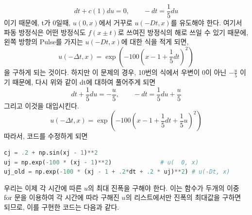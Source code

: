 \documentclass[11pt]{article}
\begin{document}
\begin{equation}
dt + c(1)du  = 0
,\qquad
-dt = \frac{1}{5}du
\end{equation}
이기 때문에, t가 0일때,  $u(0,x)$에서 거꾸로 $u(-Dt, x)$를 유도해야 한다. 여기서 파동 방정식은 어떤 방정식도 $f(x \pm t)$로 쓰여진 방정식의 해로 쓰일 수 있기 때문에,  왼쪽 방향의 Pulse를 가지는 $u(-Dt, x)$에 대한 식을 적게 되면, 
\begin{equation}
u(-\Delta t, x) = \exp(-100 (x -1 + \frac{1}{5}dt)^2)
\end{equation}
을 구하게 되는 것이다. 하지만 이 문제의 경우, 10번의 식에서 우변이 0이 아닌 $-\frac{u}{5}$ 이기 때문에, 다시 위와 같이 dt에 대하여 풀어주게 되면
\begin{equation}
dt + \frac{1}{5}du  = -\frac{u}{5}
,\qquad
-dt = \frac{1}{5}du  + \frac{u}{5}
\end{equation}
그리고 이것을 대입시킨다.
\begin{equation}
u(-\Delta t, x) = \exp(-100 (x -1 + \frac{1}{5}dt + \frac{1}{5}u)^2)
\end{equation}
따라서, 코드를 수정하게 되면

\begin{lstlisting}[language=Python]
cj = .2 + np.sin(xj - 1)**2
uj = np.exp(-100 * (xj - 1)**2)              # u(  0, x)
uj_old = np.exp(-100 * (xj - 1 + .2*dt + .2 * uj)**2) # u(-Dt, x)
\end{lstlisting}

우리는 이제 각 시간에 따른 $u$의 최대 진폭을 구해야 한다. 이는 함수가 두개의 이중 for 문을 이용하여 각 시간에 따라 구해진 $u$의 리스트에서만 진폭의 최대값을 구하면 되므로, 이를 구현한 코드는 다음과 같다.
\end{document}
